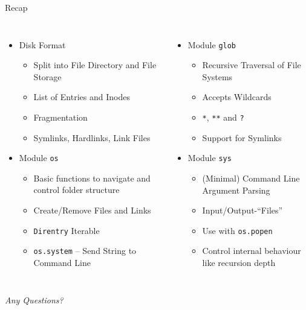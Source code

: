 
\begin{frame}[t,plain]
\titlepage
\end{frame}


\begin{frame}{Recap}
%
\begin{columns}[T]
\begin{itemize}
\item Disk Format
	\begin{itemize}
	\item Split into File Directory and File Storage
	\item List of Entries and Inodes
	\item Fragmentation
	\item Symlinks, Hardlinks, Link Files
	\end{itemize}
\item Module \texttt{os}
	\begin{itemize}
	\item Basic functions to navigate and control folder structure
	\item Create/Remove Files and Links
	\item \texttt{Direntry} Iterable
	\item \texttt{os.system} -- Send String to Command Line
	\end{itemize}
\end{itemize}
%
\begin{itemize}
\item Module \texttt{glob}
	\begin{itemize}
	\item Recursive Traversal of File Systems
	\item Accepts Wildcards
	\item \texttt{*}, \texttt{**} and \texttt{?}
	\item Support for Symlinks
	\end{itemize}
\item Module \texttt{sys}
	\begin{itemize}
	\item (Minimal) Command Line Argument Parsing
	\item Input/Output-\enquote{Files}
	\item Use with \texttt{os.popen}
	\item Control internal behaviour like recursion depth
	\end{itemize}
\end{itemize}

\end{columns}
%
\begin{center}
	\emph{Any Questions?}
\end{center}
%
\end{frame}

